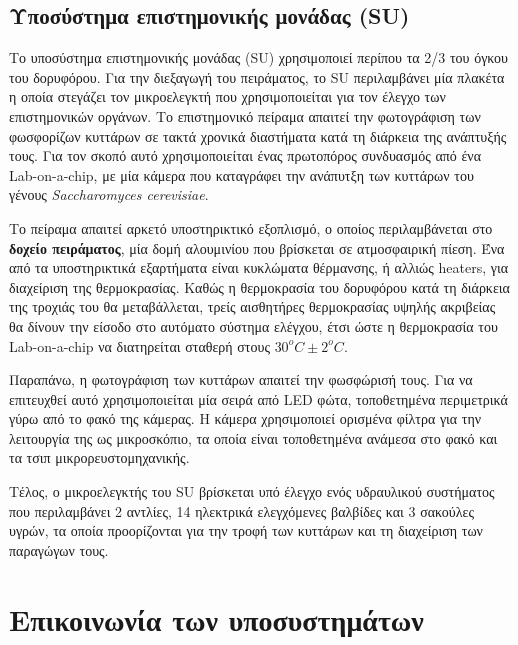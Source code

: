 \documentclass[a4paper,nobib,justified]{tufte-book}
\begin{document}
\subsection{Υποσύστημα επιστημονικής μονάδας (\acs{SU})}

Το υποσύστημα επιστημονικής μονάδας (SU) χρησιμοποιεί περίπου τα 2/3 του όγκου του δορυφόρου. Για την διεξαγωγή του πειράματος, το \acs{SU} περιλαμβάνει μία πλακέτα η οποία στεγάζει τον μικροελεγκτή που χρησιμοποιείται για τον έλεγχο των επιστημονικών οργάνων. Το επιστημονικό πείραμα απαιτεί την φωτογράφιση των φωσφορίζων κυττάρων σε τακτά χρονικά διαστήματα κατά τη διάρκεια της ανάπτυξής τους. Για τον σκοπό αυτό χρησιμοποιείται ένας πρωτοπόρος συνδυασμός από ένα Lab-on-a-chip, με μία κάμερα που καταγράφει την ανάπυτξη των κυττάρων του γένους \textit{Saccharomyces cerevisiae}.

Το πείραμα απαιτεί αρκετό υποστηρικτικό εξοπλισμό, ο οποίος περιλαμβάνεται στο \textbf{δοχείο πειράματος}, μία δομή αλουμινίου που βρίσκεται σε ατμοσφαιρική πίεση. Ένα από τα υποστηρικτικά εξαρτήματα είναι κυκλώματα θέρμανσης, ή αλλιώς heaters, για διαχείριση της θερμοκρασίας. Καθώς η θερμοκρασία του δορυφόρου κατά τη διάρκεια της τροχιάς του θα μεταβάλλεται, τρείς αισθητήρες θερμοκρασίας υψηλής ακριβείας θα δίνουν την είσοδο στο αυτόματο σύστημα ελέγχου, έτσι ώστε η θερμοκρασία του Lab-on-a-chip να διατηρείται σταθερή στους $30^o C \pm 2^oC$. %

Παραπάνω, η φωτογράφιση των κυττάρων απαιτεί την φωσφώρισή τους. Για να επιτευχθεί αυτό χρησιμοποιείται μία σειρά από LED φώτα, τοποθετημένα περιμετρικά γύρω από το φακό της κάμερας. Η κάμερα χρησιμοποιεί ορισμένα φίλτρα για την λειτουργία της ως μικροσκόπιο, τα οποία είναι τοποθετημένα ανάμεσα στο φακό και τα τσιπ μικρορευστομηχανικής.

Τέλος, ο μικροελεγκτής του SU βρίσκεται υπό έλεγχο ενός υδραυλικού συστήματος που περιλαμβάνει 2 αντλίες, 14 ηλεκτρικά ελεγχόμενες βαλβίδες και 3 σακούλες υγρών, τα οποία προορίζονται για την τροφή των κυττάρων και τη διαχείριση των παραγώγων τους.

\section{Επικοινωνία των υποσυστημάτων}
\end{document}
